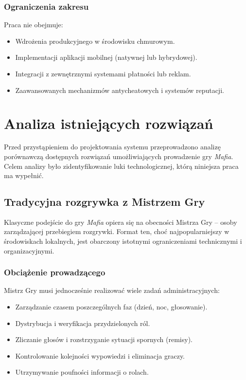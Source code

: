 ﻿\documentclass[a4paper,twoside,11pt]{mwrep}
\theoremstyle{plain} \newtheorem{thm}{Twierdzenie}
\theoremstyle{plain} \newtheorem{lem}{Lemat}
\theoremstyle{definition} \newtheorem{defn}{Definicja}
\theoremstyle{remark} \newtheorem*{rem}{Wniosek}
\begin{document}
\subsection{Ograniczenia zakresu}
Praca nie obejmuje:
\begin{itemize}
    \item Wdrożenia produkcyjnego w środowisku chmurowym.
    \item Implementacji aplikacji mobilnej (natywnej lub hybrydowej).
    \item Integracji z zewnętrznymi systemami płatności lub reklam.
    \item Zaawansowanych mechanizmów antycheatowych i systemów reputacji.
\end{itemize}
\chapter{Analiza istniejących rozwiązań}
\label{chap:analiza_istniejacych_rozwiazan}

Przed przystąpieniem do projektowania systemu przeprowadzono analizę porównawczą dostępnych rozwiązań umożliwiających prowadzenie gry \textit{Mafia}. Celem analizy było zidentyfikowanie luki technologicznej, którą niniejsza praca ma wypełnić.

\section{Tradycyjna rozgrywka z Mistrzem Gry}

Klasyczne podejście do gry \textit{Mafia} opiera się na obecności Mistrza Gry -- osoby zarządzającej przebiegiem rozgrywki. Format ten, choć najpopularniejszy w środowiskach lokalnych, jest obarczony istotnymi ograniczeniami technicznymi i organizacyjnymi.

\subsection{Obciążenie prowadzącego}

Mistrz Gry musi jednocześnie realizować wiele zadań administracyjnych:
\begin{itemize}
    \item Zarządzanie czasem poszczególnych faz (dzień, noc, głosowanie).
    \item Dystrybucja i weryfikacja przydzielonych ról.
    \item Zliczanie głosów i rozstrzyganie sytuacji spornych (remisy).
    \item Kontrolowanie kolejności wypowiedzi i eliminacja graczy.
    \item Utrzymywanie poufności informacji o rolach.
\end{itemize}
\end{document}
